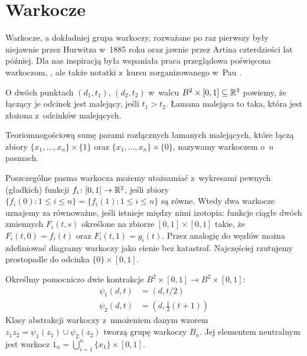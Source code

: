 
\section{Warkocze}
\label{sec:braid}
Warkocze, a dokładniej grupa warkoczy, rozważane po raz pierwszy były niejawnie przez Hurwitza w~1885 roku oraz jawnie przez Artina czterdzieści lat później.
%
Dla nas inspiracją była wspaniała praca przeglądowa poświęcona warkoczom, \cite{birman05}, ale także notatki z~kursu zorganizowanego w~Pau \cite{gonzalez11}.

O dwóch punktach $(d_1, t_1)$, $(d_2, t_2)$ w~walcu $B^2 \times [0, 1] \subseteq \mathbb R^3$ powiemy, że łączący je odcinek jest malejący, jeśli $t_1 > t_2$.
Łamana malejąca to taka, która jest złożona z~odcinków malejących.

\begin{definition}[warkocz]
%
Teoriomnogościową sumę parami rozłącznych łamanych malejących, które łączą zbiory $\{x_1, \ldots, x_n\} \times \{1\}$ oraz $\{x_1, \ldots, x_n\} \times \{0\}$, nazywamy warkoczem o~$n$ pasmach.
\end{definition}

Poszczególne pasma warkocza możemy utożsamiać z~wykresami pewnych (gładkich) funkcji $f_i \colon [0, 1] \to \mathbb R^2$, jeśli zbiory $\{f_i(0) : 1 \le i \le n\} = \{f_i(1) : 1 \le i \le n\}$ są równe.
Wtedy dwa warkocze uznajemy za równoważne, jeśli istnieje między nimi izotopia: funkcje ciągłe dwóch zmiennych $F_i(t, s)$ określone na zbiorze $[0,1] \times [0,1]$ takie, że $F_i(t,0)= f_i(t)$ oraz $F_i(t, 1) = g_i(t)$.
Przez analogię do węzłów można zdefiniować diagramy warkoczy jako cienie bez katastrof.
Najczęściej rzutujemy prostopadle do odcinka $\{0\} \times [0, 1]$.

\begin{definition}
%
    Określmy pomocniczo dwie kontrakcje $B^2 \times [0,1] \to B^2 \times [0,1]$:
    \begin{align*}
        \psi_1(d, t)&  = (d, t/2) \\
        \psi_2(d, t)&  = (d, \frac12 (t+1))
    \end{align*}
    Klasy abstrakcji warkoczy z~mnożeniem danym wzorem $z_1z_2 = \psi_1(z_1) \cup \psi_2(z_2)$ tworzą grupę warkoczy $B_n$.
    Jej elementem neutralnym jest warkocz $1_n = \bigcup_{i = 1}^n \{x_1\} \times [0,1]$.
\end{definition}

